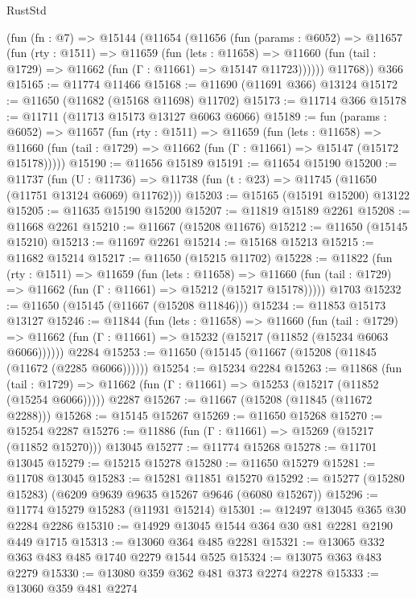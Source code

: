\begin{lexlean}{RustStd}
\begin{coremodule}
    (fun (fn : @7) =>
    @15144
      (@11654
        (@11656
          (fun (params : @6052) =>
          @11657
            (fun (rty : @1511) =>
            @11659
              (fun (lets : @11658) =>
              @11660 (fun (tail : @1729) => @11662 (fun (Γ : @11661) => @15147 @11723))))))
        @11768))
    @366
@15165 := @11774 @11466
@15168 := @11690 (@11691 @366) @13124
@15172 := @11650 (@11682 (@15168 @11698) @11702)
@15173 := @11714 @366
@15178 := @11711 (@11713 @15173 @13127 @6063 @6066)
@15189 := fun (params : @6052) =>
  @11657
    (fun (rty : @1511) =>
    @11659
      (fun (lets : @11658) =>
      @11660 (fun (tail : @1729) => @11662 (fun (Γ : @11661) => @15147 (@15172 @15178)))))
@15190 := @11656 @15189
@15191 := @11654 @15190
@15200 := @11737
    (fun (U : @11736) => @11738 (fun (t : @23) => @11745 (@11650 (@11751 @13124 @6069) @11762)))
@15203 := @15165 (@15191 @15200) @13122
@15205 := @11635 @15190 @15200
@15207 := @11819 @15189 @2261
@15208 := @11668 @2261
@15210 := @11667 (@15208 @11676)
@15212 := @11650 (@15145 @15210)
@15213 := @11697 @2261
@15214 := @15168 @15213
@15215 := @11682 @15214
@15217 := @11650 (@15215 @11702)
@15228 := @11822
    (fun (rty : @1511) =>
    @11659
      (fun (lets : @11658) =>
      @11660 (fun (tail : @1729) => @11662 (fun (Γ : @11661) => @15212 (@15217 @15178)))))
    @1703
@15232 := @11650 (@15145 (@11667 (@15208 @11846)))
@15234 := @11853 @15173 @13127
@15246 := @11844
    (fun (lets : @11658) =>
    @11660
      (fun (tail : @1729) =>
      @11662 (fun (Γ : @11661) => @15232 (@15217 (@11852 (@15234 @6063 @6066))))))
    @2284
@15253 := @11650 (@15145 (@11667 (@15208 (@11845 (@11672 (@2285 @6066))))))
@15254 := @15234 @2284
@15263 := @11868
    (fun (tail : @1729) => @11662 (fun (Γ : @11661) => @15253 (@15217 (@11852 (@15254 @6066)))))
    @2287
@15267 := @11667 (@15208 (@11845 (@11672 @2288)))
@15268 := @15145 @15267
@15269 := @11650 @15268
@15270 := @15254 @2287
@15276 := @11886 (fun (Γ : @11661) => @15269 (@15217 (@11852 @15270))) @13045
@15277 := @11774 @15268
@15278 := @11701 @13045
@15279 := @15215 @15278
@15280 := @11650 @15279
@15281 := @11708 @13045
@15283 := @15281 @11851 @15270
@15292 := @15277 (@15280 @15283) (@6209 @9639 @9635 @15267 @9646 (@6080 @15267))
@15296 := @11774 @15279 @15283 (@11931 @15214)
@15301 := @12497 @13045 @365 @30 @2284 @2286
@15310 := @14929 @13045 @1544 @364 @30 @81 @2281 @2190 @449 @1715
@15313 := @13060 @364 @485 @2281
@15321 := @13065 @332 @363 @483 @485 @1740 @2279 @1544 @525
@15324 := @13075 @363 @483 @2279
@15330 := @13080 @359 @362 @481 @373 @2274 @2278
@15333 := @13060 @359 @481 @2274

\end{coremodule}
\end{lexlean}
